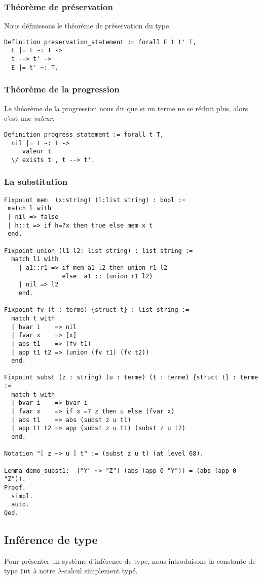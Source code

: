 \subsubsection{Théorème de préservation}
Nous définissons le théorème de préservation du type.
\begin{Verbatim}
Definition preservation_statement := forall E t t' T,
  E |= t ~: T ->
  t --> t' ->
  E |= t' ~: T.
\end{Verbatim}

\subsubsection{Théorème de la progression}
Le théorème de la progression nous dit que si un terme ne se réduit plus, alors c'est une \textit{valeur}.
\begin{Verbatim}
Definition progress_statement := forall t T, 
  nil |= t ~: T ->
     valeur t 
  \/ exists t', t --> t'.
\end{Verbatim}


\subsubsection{La substitution}
\begin{Verbatim}
Fixpoint mem  (x:string) (l:list string) : bool :=
 match l with
 | nil => false
 | h::t => if h=?x then true else mem x t 
 end.

Fixpoint union (l1 l2: list string) : list string :=
  match l1 with
    | a1::r1 => if mem a1 l2 then union r1 l2
                else  a1 :: (union r1 l2)
    | nil => l2
    end.

Fixpoint fv (t : terme) {struct t} : list string :=
  match t with
  | bvar i    => nil
  | fvar x    => [x]
  | abs t1    => (fv t1)
  | app t1 t2 => (union (fv t1) (fv t2))
  end.

Fixpoint subst (z : string) (u : terme) (t : terme) {struct t} : terme :=
  match t with
  | bvar i    => bvar i
  | fvar x    => if x =? z then u else (fvar x)
  | abs t1    => abs (subst z u t1)
  | app t1 t2 => app (subst z u t1) (subst z u t2)
  end.

Notation "[ z ~> u ] t" := (subst z u t) (at level 68).

Lemma demo_subst1:  ["Y" ~> "Z"] (abs (app 0 "Y")) = (abs (app 0 "Z")).
Proof.
  simpl.
  auto.
Qed.
\end{Verbatim}

\subsection{Inférence de type}
Pour présenter un système d'inférence de type, nous introduisons la constante de type \verb+Int+ à notre $\lambda$-calcul
simplement typé.

